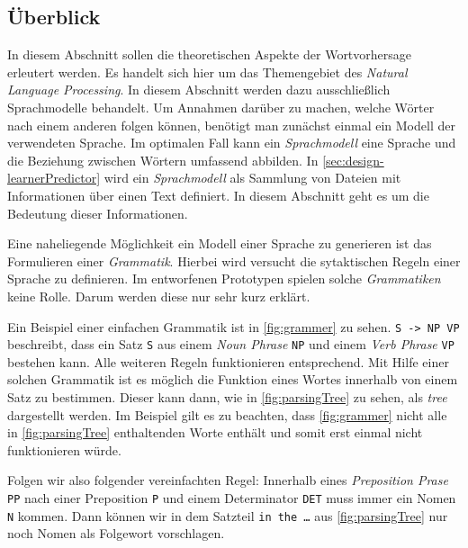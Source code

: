 \subsection{Überblick}
\label{sec:langmodels}

    In diesem Abschnitt sollen die theoretischen Aspekte der Wortvorhersage erleutert werden. Es handelt sich hier um das Themengebiet des \emph{Natural Language Processing}. In diesem Abschnitt werden dazu ausschließlich Sprachmodelle behandelt. Um Annahmen darüber zu machen, welche Wörter nach einem anderen folgen können, benötigt man zunächst einmal ein Modell der verwendeten Sprache. Im optimalen Fall kann ein \emph{Sprachmodell} eine Sprache und die Beziehung zwischen Wörtern umfassend abbilden. In \autoref{sec:design-learnerPredictor} wird ein \emph{Sprachmodell} als Sammlung von Dateien mit Informationen über einen Text definiert. In diesem Abschnitt geht es um die Bedeutung dieser Informationen.
        
    Eine naheliegende Möglichkeit ein Modell einer Sprache zu generieren ist das Formulieren einer \emph{Grammatik}. Hierbei wird versucht die sytaktischen Regeln einer Sprache zu definieren. Im entworfenen Prototypen spielen solche \emph{Grammatiken} keine Rolle. Darum werden diese nur sehr kurz erklärt.
        
    Ein Beispiel einer einfachen Grammatik ist in \autoref{fig:grammer} zu sehen. \texttt{S -> NP VP} beschreibt, dass ein Satz \texttt{S} aus einem \emph{Noun Phrase} \texttt{NP} und einem \emph{Verb Phrase} \texttt{VP} bestehen kann. Alle weiteren Regeln funktionieren entsprechend. Mit Hilfe einer solchen Grammatik ist es möglich die Funktion eines Wortes innerhalb von einem Satz zu bestimmen. Dieser kann dann, wie in \autoref{fig:parsingTree} zu sehen,  als \emph{tree} dargestellt werden. Im Beispiel gilt es zu beachten, dass \autoref{fig:grammer} nicht alle in \autoref{fig:parsingTree} enthaltenden Worte enthält und somit erst einmal nicht funktionieren würde.
        
    Folgen wir also folgender vereinfachten Regel: Innerhalb eines \emph{Preposition Prase} \texttt{PP} nach einer Preposition \texttt{P} und einem Determinator \texttt{DET} muss immer ein Nomen \texttt{N} kommen. Dann können wir in dem Satzteil \texttt{in the …} aus \autoref{fig:parsingTree} nur noch Nomen als Folgewort vorschlagen.
        
